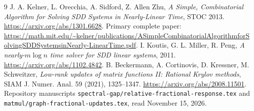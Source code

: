 \documentclass[11pt]{article}
\begin{document}
\begin{thebibliography}{9}
 J. A. Kelner, L. Orecchia, A. Sidford, Z. Allen Zhu,
\emph{A Simple, Combinatorial Algorithm for Solving SDD Systems in
Nearly-Linear Time}, STOC 2013.
\url{https://arxiv.org/abs/1301.6628}.
Primary complete paper:
\url{https://math.mit.edu/~kelner/publications/ASimpleCombinatorialAlgorithmforSolvingSDDSystemsinNearly-LinearTime.pdf}.
 I. Koutis, G. L. Miller, R. Peng,
\emph{A nearly-$m\log n$ time solver for SDD linear systems}, 2011.
\url{https://arxiv.org/abs/1102.4842}.
 B. Beckermann, A. Cortinovis, D. Kressner, M. Schweitzer,
\emph{Low-rank updates of matrix functions II: Rational Krylov methods},
SIAM J. Numer. Anal. 59 (2021), 1325--1347.
\url{https://arxiv.org/abs/2008.11501}.
 Repository manuscripts
\texttt{spectral-gap/relative-fractional-response.tex} and
\texttt{matmul/graph-fractional-updates.tex}, read November 15, 2026.
\end{thebibliography}
\end{document}
